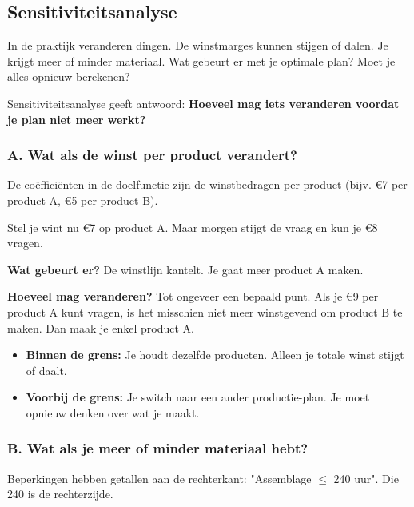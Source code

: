 \documentclass[a4paper,11pt]{article}
\begin{document}
\subsection{Sensitiviteitsanalyse}

In de praktijk veranderen dingen. De winstmarges kunnen stijgen of dalen. Je krijgt meer of minder materiaal. Wat gebeurt er met je optimale plan? Moet je alles opnieuw berekenen?

Sensitiviteitsanalyse geeft antwoord: \textbf{Hoeveel mag iets veranderen voordat je plan niet meer werkt?}

\subsubsection{A. Wat als de winst per product verandert?}

\begin{conceptbox}[title=Doelfunctie-coëfficiënten]
De coëfficiënten in de doelfunctie zijn de winstbedragen per product (bijv. €7 per product A, €5 per product B).
\end{conceptbox}

Stel je wint nu €7 op product A. Maar morgen stijgt de vraag en kun je €8 vragen.

\textbf{Wat gebeurt er?} De winstlijn kantelt. Je gaat meer product A maken.

\textbf{Hoeveel mag veranderen?} Tot ongeveer een bepaald punt. Als je €9 per product A kunt vragen, is het misschien niet meer winstgevend om product B te maken. Dan maak je enkel product A.

\begin{itemize}
    \item \textbf{Binnen de grens:} Je houdt dezelfde producten. Alleen je totale winst stijgt of daalt.
    \item \textbf{Voorbij de grens:} Je switch naar een ander productie-plan. Je moet opnieuw denken over wat je maakt.
\end{itemize}

\subsubsection{B. Wat als je meer of minder materiaal hebt?}

\begin{conceptbox}[title=Rechterzijde van beperkingen (RHS)]
Beperkingen hebben getallen aan de rechterkant: "Assemblage $\leq$ 240 uur". Die 240 is de rechterzijde.
\end{conceptbox}
\end{document}
